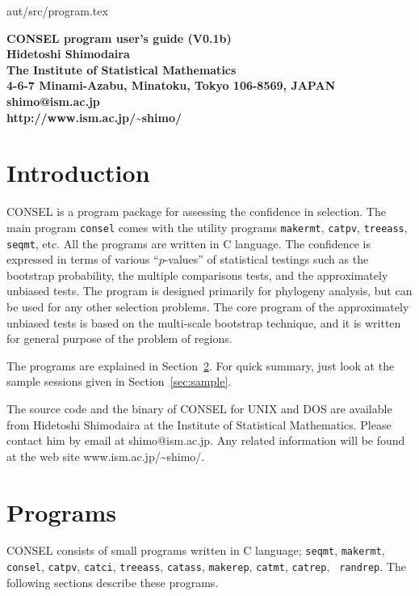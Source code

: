 \documentclass[12pt]{article}
\newcommand{\refsec}[1]{Section~\ref{sec:#1}}
\begin{document}
{aut/src/program.tex\hfill \documentid}
\begin{center}
 \bf\large CONSEL program user's guide (V0.1b)\\[3ex]
 Hidetoshi Shimodaira\\[2ex]
 \normalsize
 The Institute of Statistical Mathematics\\
 4-6-7 Minami-Azabu, Minatoku, Tokyo 106-8569, JAPAN\\
 shimo@ism.ac.jp\\
 http://www.ism.ac.jp/\~{}shimo/
\end{center}

\section{Introduction}

CONSEL is a program package for assessing the confidence in
selection. The main program {\tt consel} comes with the utility programs
{\tt makermt}, {\tt catpv}, {\tt treeass}, {\tt seqmt}, etc. All the
programs are written in C language. The confidence is expressed in terms
of various ``$p$-values'' of statistical testings such as the bootstrap
probability, the multiple comparisons tests, and the approximately
unbiased tests. The program is designed primarily for phylogeny
analysis, but can be used for any other selection problems. The core
program of the approximately unbiased tests is based on the multi-scale
bootstrap technique, and it is written for general purpose of the
problem of regions.

The programs are explained in \refsec{usage}.  For quick summary, just
look at the sample sessions given in \refsec{sample}.

The source code and the binary of CONSEL for UNIX and DOS are available
from Hidetoshi Shimodaira at the Institute of Statistical
Mathematics. Please contact him by email at shimo@ism.ac.jp. Any related
information will be found at the web site www.ism.ac.jp/\~{}shimo/.



\section{Programs} \label{sec:usage}

CONSEL consists of small programs written in C language; {\tt seqmt},
{\tt makermt}, {\tt consel}, {\tt catpv}, {\tt catci}, {\tt treeass},
{\tt catass}, {\tt makerep}, {\tt catmt}, {\tt catrep}, {\tt
randrep}. The following sections describe these programs.
\end{document}
